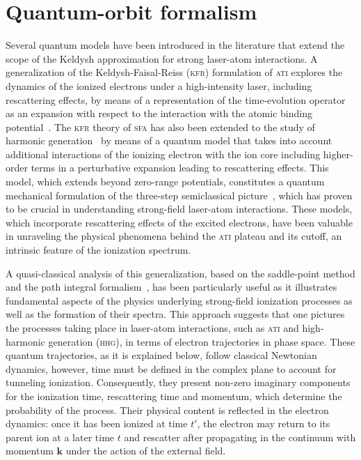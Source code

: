 

\section{\label{sec:q_paths} Quantum-orbit formalism}

Several quantum models have been introduced in the literature that
extend the scope of the Keldysh approximation for strong laser-atom
interactions. A generalization of the Keldysh-Faisal-Reiss
(\textsc{kfr}) formulation of \textsc{ati} explores the dynamics of
the ionized electrons under a high-intensity laser, including
rescattering effects, by means of a representation of the
time-evolution operator as an expansion with respect to the
interaction with the atomic binding
potential~\cite{Kopold_1997sfa}. The \textsc{kfr} theory of
\textsc{sfa} has also been extended to the study of
harmonic generation~\cite{LewensteinSPA_1994,Lewenstein_1995} by means
of a quantum model that takes into account additional interactions of
the ionizing electron with the ion core including higher-order terms
in a perturbative expansion leading to rescattering effects. This
model, which extends beyond zero-range potentials, constitutes a
quantum mechanical formulation of the three-step semiclassical
picture~\cite{Becker_2step1986}, which has proven to be crucial in
understanding strong-field laser-atom interactions. These models,
which incorporate rescattering effects of the excited electrons, have
been valuable in unraveling the physical phenomena behind the
\textsc{ati} plateau and its cutoff, an intrinsic feature of the
ionization spectrum.

A quasi-classical analysis of this generalization, based on the
saddle-point method and the path integral
formalism~\cite{KopoldOptComm2000,Becker_ellipticalSPA,LewScience2001},
has been particularly useful as it illustrates fundamental aspects of
the physics underlying strong-field ionization processes as well as
the formation of their spectra. This approach suggests that one
pictures the processes taking place in laser-atom interactions, such
as \textsc{ati} and high-harmonic generation (\textsc{hhg}), in terms
of electron trajectories in phase space. These quantum trajectories,
as it is explained below, follow classical Newtonian dynamics,
however, time must be defined in the complex plane to account for
tunneling ionization. Consequently, they present non-zero imaginary
components for the ionization time, rescattering time and momentum,
which determine the probability of the process. Their physical content
is reflected in the electron dynamics: once it has been ionized at
time $t'$, the electron may return to its parent ion at a later time
$t$ and rescatter after propagating in the continuum with momentum
$\mathbf{k}$ under the action of the external field.

